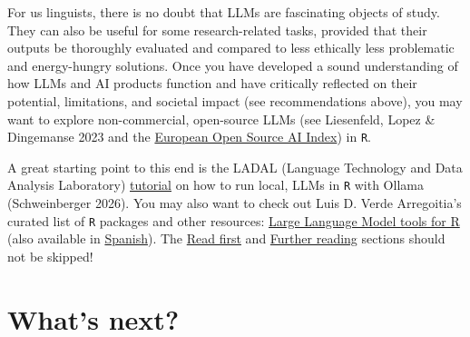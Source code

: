 \documentclass[
  letterpaper,
  DIV=11,
  numbers=noendperiod]{scrreprt}
\begin{document}
\begin{tcolorbox}[enhanced jigsaw, arc=.35mm, bottomrule=.15mm, bottomtitle=1mm, breakable, colback=white, colbacktitle=quarto-callout-caution-color!10!white, colframe=quarto-callout-caution-color-frame, coltitle=black, left=2mm, leftrule=.75mm, opacityback=0, opacitybacktitle=0.6, rightrule=.15mm, title=\textcolor{quarto-callout-caution-color}{\faFire}\hspace{0.5em}{Using LLMs in \texttt{R}}, titlerule=0mm, toprule=.15mm, toptitle=1mm]

For us linguists, there is no doubt that LLMs are fascinating objects of
study. They can also be useful for some research-related tasks, provided
that their outputs be thoroughly evaluated and compared to less
ethically less problematic and energy-hungry solutions. Once you have
developed a sound understanding of how LLMs and AI products function and
have critically reflected on their potential, limitations, and societal
impact (see recommendations above), you may want to explore
non-commercial, open-source LLMs (see Liesenfeld, Lopez \& Dingemanse
2023 and the \href{https://osai-index.eu/}{European Open Source AI
Index}) in \texttt{R}.

A great starting point to this end is the LADAL (Language Technology and
Data Analysis Laboratory)
\href{https://ladal.edu.au/tutorials/ollamar/ollamar}{tutorial} on how
to run local, LLMs in \texttt{R} with Ollama (Schweinberger 2026). You
may also want to check out Luis D. Verde Arregoitia's curated list of
\texttt{R} packages and other resources:
\href{https://luisdva.github.io/llmsr-book/}{Large Language Model tools
for R} (also available in
\href{https://luisdva.github.io/llmsr-book//es/index.es.html}{Spanish}).
The \href{https://luisdva.github.io/llmsr-book/before-start.html}{Read
first} and
\href{https://luisdva.github.io/llmsr-book/courses.html}{Further
reading} sections should not be skipped!

\end{tcolorbox}

\section{\texorpdfstring{What's next?
}{What's next? }}\label{whats-next}
\end{document}
